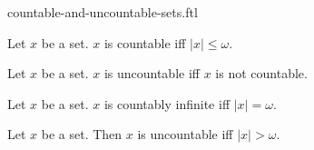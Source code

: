\documentclass{naproche-library}
\begin{document}
\begin{smodule}[title=Countable and Uncountable Sets]{countable-and-uncountable-sets.ftl}

\begin{definition}[forthel,id=SET_THEORY_07_8808604616359936]
  Let $x$ be a set.
  $x$ is countable iff $|x| \leq \omega$.
\end{definition}

\begin{definition}[forthel,id=SET_THEORY_07_2935263915409408]
  Let $x$ be a set.
  $x$ is uncountable iff $x$ is not countable.
\end{definition}

\begin{definition}[forthel,id=SET_THEORY_07_5679866426949632]
  Let $x$ be a set.
  $x$ is countably infinite iff $|x| = \omega$.
\end{definition}

\begin{proposition}[forthel,id=SET_THEORY_07_4281623468048384]
  Let $x$ be a set.
  Then $x$ is uncountable iff $|x| > \omega$.
\end{proposition}
\end{smodule}
\end{document}
